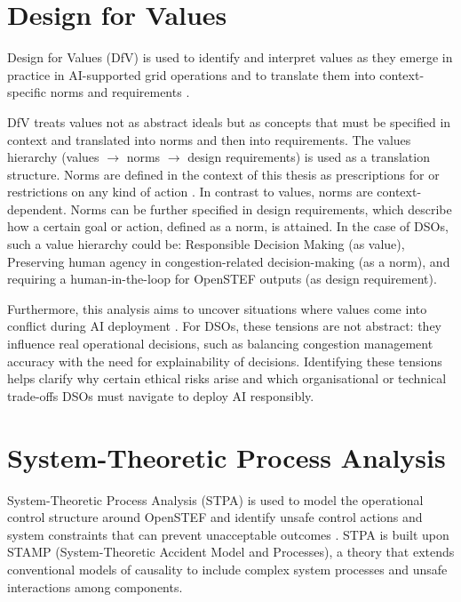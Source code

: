 \section{Design for Values}
\label{sec:dfv}

Design for Values (DfV) is used to identify and interpret values as they emerge in practice in AI-supported grid operations and to translate them into context-specific norms and requirements \autocite{vanDePoel2020}.

DfV treats values not as abstract ideals but as concepts that must be specified in context and translated into norms and then into requirements. The values hierarchy (values $\rightarrow$ norms $\rightarrow$ design requirements) \autocite{vanDePoel2013} is used as a translation structure. Norms are defined in the context of this thesis as prescriptions for or restrictions on any kind of action \autocite{vanDePoel2013}. In contrast to values, norms are context-dependent. Norms can be further specified in design requirements, which describe how a certain goal or action, defined as a norm, is attained. In the case of DSOs, such a value hierarchy could be: Responsible Decision Making (as value), Preserving human agency in congestion-related decision-making (as a norm), and requiring a human-in-the-loop for OpenSTEF outputs (as design requirement).

Furthermore, this analysis aims to uncover situations where values come into conflict during AI deployment \autocite{vanDePoel2013}. For DSOs, these tensions are not abstract: they influence real operational decisions, such as balancing congestion management accuracy with the need for explainability of decisions. Identifying these tensions helps clarify why certain ethical risks arise and which organisational or technical trade-offs DSOs must navigate to deploy AI responsibly.

\section{System-Theoretic Process Analysis}
\label{sec:stpa}

System-Theoretic Process Analysis (STPA) is used to model the operational control structure around OpenSTEF and identify unsafe control actions and system constraints that can prevent unacceptable outcomes \autocite{Dobbe2022, Leveson2011}. STPA is built upon STAMP (System-Theoretic Accident Model and Processes), a theory that extends conventional models of causality to include complex system processes and unsafe interactions among components.

